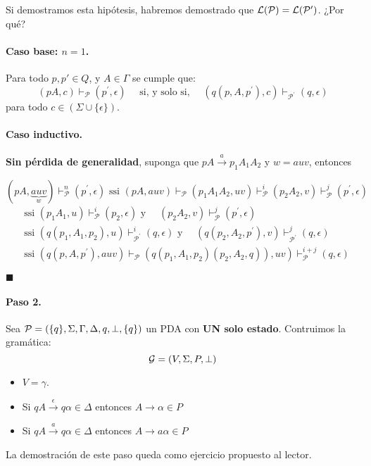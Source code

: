 Si demostramos esta hipótesis, habremos demostrado que $\mathcal{L}(\mathcal{P}) = \mathcal{L}(\mathcal{P'})$. ¿Por qué?

\paragraph{Caso base: $n=1$.} Para todo $p,p' \in Q$, y $A \in \Gamma$ se cumple que:
$$
    (p A, c) \vdash_\mathcal{P}\left(p^{\prime}, \epsilon\right) \quad \text { si, y solo si, } \quad\left(q\left(p, A, p^{\prime}\right), c\right) \vdash_{\mathcal{P}^{\prime}}(q, \epsilon)
$$
para todo $c \in (\Sigma \cup \{\epsilon\})$.

\paragraph{Caso inductivo.} \textbf{Sin pérdida de generalidad}, suponga que $pA \overset{a}{\to} p_1A_1A_2$ y $w=auv$, entonces

$$
(p A, \underbrace{a u v}_w) \vdash_{\mathcal{P}}^n\left(p^{\prime}, \epsilon\right) \text { ssi }(p A, a u v) \vdash_{\mathcal{P}}\left(p_1 A_1 A_2, u v\right) \vdash_{\mathcal{P}}^i\left(p_2 A_2, v\right) \vdash_{\mathcal{P}}^j\left(p^{\prime}, \epsilon\right)
$$
\begin{align*}
    &\text{ssi }  \left(p_1 A_1, u\right) \vdash_{\mathcal{P}}^i\left(p_2, \epsilon\right) \text { y } \quad\left(p_2 A_2, v\right) \vdash_{\mathcal{P}}^j\left(p^{\prime}, \epsilon\right) \\
&\text {ssi }  \left(q\left(p_1, A_1, p_2\right), u\right) \vdash_{\mathcal{P}^{\prime}}^i(q, \epsilon) \text { y } \quad\left(q\left(p_2, A_2, p^{\prime}\right), v\right) \vdash_{\mathcal{P}^{\prime}}^j(q, \epsilon) \\
&\text {ssi }  \left.\left(q\left(p, A, p^{\prime}\right), auv\right) \vdash_{\mathcal{P}}\left(q\left(p_1, A_1, p_2\right)\left(p_2, A_2, q\right)\right), u v\right) \vdash_{\mathcal{P}}^{i+j}(q, \epsilon)
\end{align*}

\hfill $\blacksquare$

\paragraph{Paso 2.} Sea $\mathcal{P}=(\{q\},\Sigma,\Gamma,\Delta,q,\bot,\{q\})$ un PDA con \textbf{UN solo estado}. Contruimos la gramática:
$$
    \mathcal{G} = (V, \Sigma, P, \bot)
$$
\begin{itemize}
    \item $V=\gamma$.
    \item Si $qA \overset{\epsilon}{\to} q\alpha \in \Delta$ entonces $A \to \alpha \in P$
    \item Si $qA \overset{a}{\to} q\alpha \in \Delta$ entonces $A \to a\alpha \in P$
\end{itemize}
La demostración de este paso queda como ejercicio propuesto al lector.
